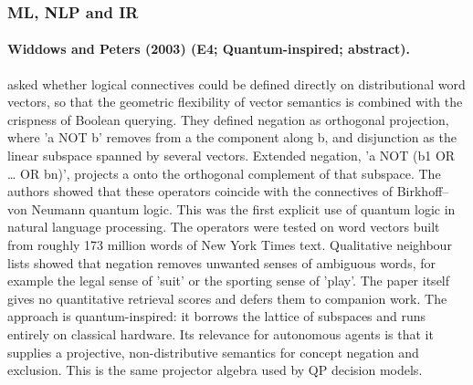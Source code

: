 \documentclass[10pt,a4paper]{article}
\begin{document}
\subsubsection*{ML, NLP and IR}
\paragraph{Widdows and Peters (2003) (E4; Quantum-inspired; abstract).} \citet{Widdows2003} asked whether logical connectives could be defined directly on distributional word vectors, so that the geometric flexibility of vector semantics is combined with the crispness of Boolean querying. They defined negation as orthogonal projection, where 'a NOT b' removes from a the component along b, and disjunction as the linear subspace spanned by several vectors. Extended negation, 'a NOT (b1 OR \ldots{} OR bn)', projects a onto the orthogonal complement of that subspace. The authors showed that these operators coincide with the connectives of Birkhoff--von Neumann quantum logic. This was the first explicit use of quantum logic in natural language processing. The operators were tested on word vectors built from roughly 173 million words of New York Times text. Qualitative neighbour lists showed that negation removes unwanted senses of ambiguous words, for example the legal sense of 'suit' or the sporting sense of 'play'. The paper itself gives no quantitative retrieval scores and defers them to companion work. The approach is quantum-inspired: it borrows the lattice of subspaces and runs entirely on classical hardware. Its relevance for autonomous agents is that it supplies a projective, non-distributive semantics for concept negation and exclusion. This is the same projector algebra used by QP decision models.
\end{document}
